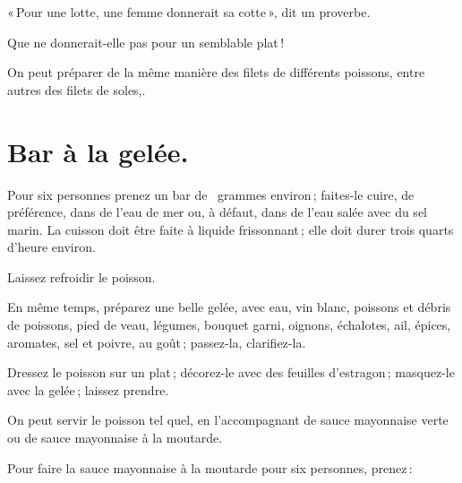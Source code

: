 \begin{center}
{\small « Pour une lotte, une femme donnerait sa cotte », dit un proverbe.}
\end{center}

\begin{center}
Que ne donnerait-elle pas pour un semblable plat !
\end{center}

\smallskip

\sk

\bigskip

On peut préparer de la même manière des filets de différents poissons, entre
autres des filets de soles,.

\section*{\centering Bar à la gelée.}
\label{pg0350} \hypertarget{p0350}{}

Pour six personnes prenez un bar de {\mmm} {\mmm} grammes environ ;
faites-le cuire, de préférence, dans de l'eau de mer ou, à défaut, dans de
l'eau salée avec du sel marin. La cuisson doit être faite à liquide
frissonnant ; elle doit durer trois quarts d'heure environ.

Laissez refroidir le poisson.

En même temps, préparez une belle gelée, avec eau, vin blanc, poissons et
débris de poissons, pied de veau, légumes, bouquet garni, oignons, échalotes,
ail, épices, aromates, sel et poivre, au goût ; passez-la, clarifiez-la.

Dressez le poisson sur un plat ; décorez-le avec des feuilles d’estragon ;
masquez-le avec la gelée ; laissez prendre.

On peut servir le poisson tel quel, en l'accompagnant de sauce mayonnaise
verte ou de sauce mayonnaise à la moutarde.

\sk

Pour faire la sauce mayonnaise à la moutarde pour six personnes, prenez :


